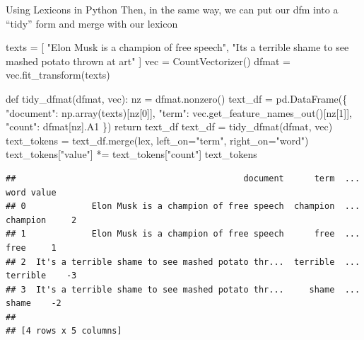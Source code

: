 \documentclass[
  10pt,
  ignorenonframetext,
  aspectratio=169]{beamer}
\newenvironment{Shaded}{\begin{snugshade}}{\end{snugshade}}
\newcommand{\ControlFlowTok}[1]{\textcolor[rgb]{0.94,0.87,0.69}{#1}}
\newcommand{\DecValTok}[1]{\textcolor[rgb]{0.86,0.86,0.80}{#1}}
\newcommand{\KeywordTok}[1]{\textcolor[rgb]{0.94,0.87,0.69}{#1}}
\newcommand{\NormalTok}[1]{\textcolor[rgb]{0.80,0.80,0.80}{#1}}
\newcommand{\OperatorTok}[1]{\textcolor[rgb]{0.94,0.94,0.82}{#1}}
\newcommand{\StringTok}[1]{\textcolor[rgb]{0.80,0.58,0.58}{#1}}
\begin{document}
\begin{frame}[fragile]{Using Lexicons in Python}
\protect\hypertarget{using-lexicons-in-python-1}{}
Then, in the same way, we can put our dfm into a ``tidy'' form and merge
with our lexicon

\medskip
\scriptsize

\begin{Shaded}
\begin{Highlighting}[]
\NormalTok{texts }\OperatorTok{=}\NormalTok{ [}
    \StringTok{"Elon Musk is a champion of free speech"}\NormalTok{,}
    \StringTok{"It\textquotesingle{}s a terrible shame to see mashed potato thrown at art"}
\NormalTok{]}
\NormalTok{vec }\OperatorTok{=}\NormalTok{ CountVectorizer()}
\NormalTok{dfmat }\OperatorTok{=}\NormalTok{ vec.fit\_transform(texts)}

\KeywordTok{def}\NormalTok{ tidy\_dfmat(dfmat, vec):}
\NormalTok{    nz }\OperatorTok{=}\NormalTok{ dfmat.nonzero()}
\NormalTok{    text\_df }\OperatorTok{=}\NormalTok{ pd.DataFrame(\{}
        \StringTok{"document"}\NormalTok{: np.array(texts)[nz[}\DecValTok{0}\NormalTok{]],}
        \StringTok{"term"}\NormalTok{: vec.get\_feature\_names\_out()[nz[}\DecValTok{1}\NormalTok{]],}
        \StringTok{"count"}\NormalTok{: dfmat[nz].A1}
\NormalTok{    \})}
    \ControlFlowTok{return}\NormalTok{ text\_df}
\NormalTok{text\_df }\OperatorTok{=}\NormalTok{ tidy\_dfmat(dfmat, vec)}
\NormalTok{text\_tokens }\OperatorTok{=}\NormalTok{ text\_df.merge(lex, left\_on}\OperatorTok{=}\StringTok{"term"}\NormalTok{, right\_on}\OperatorTok{=}\StringTok{"word"}\NormalTok{)}
\NormalTok{text\_tokens[}\StringTok{"value"}\NormalTok{] }\OperatorTok{*=}\NormalTok{ text\_tokens[}\StringTok{"count"}\NormalTok{]}
\NormalTok{text\_tokens}
\end{Highlighting}
\end{Shaded}

\begin{verbatim}
##                                             document      term  ...      word value
## 0             Elon Musk is a champion of free speech  champion  ...  champion     2
## 1             Elon Musk is a champion of free speech      free  ...      free     1
## 2  It's a terrible shame to see mashed potato thr...  terrible  ...  terrible    -3
## 3  It's a terrible shame to see mashed potato thr...     shame  ...     shame    -2
## 
## [4 rows x 5 columns]
\end{verbatim}
\end{frame}
\end{document}
